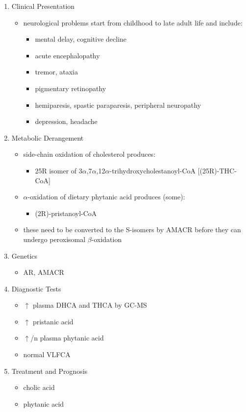 \documentclass{scrartcl}
\begin{document}
\begin{enumerate}
\item Clinical Presentation
\label{sec:org27cf602}
\begin{itemize}
\item neurological problems start from childhood to late adult life and
include:
\begin{itemize}
\item mental delay, cognitive decline
\item acute encephalopathy
\item tremor, ataxia
\item pigmentary retinopathy
\item hemiparesis, spastic paraparesis, peripheral neuropathy
\item depression, headache
\end{itemize}
\end{itemize}

\item Metabolic Derangement
\label{sec:org3d289dd}
\begin{itemize}
\item side-chain oxidation of cholesterol produces:
\begin{itemize}
\item 25R isomer of 3\(\alpha\),7\(\alpha\),12\(\alpha\)-trihydroxycholestanoyl-CoA [(25R)-THC-CoA]
\end{itemize}
\item \(\alpha\)-oxidation of dietary phytanic acid produces (some):
\begin{itemize}
\item (2R)-pristanoyl-CoA
\end{itemize}
\item these need to be converted to the S-isomers by AMACR before they can
undergo peroxisomal \(\beta\)-oxidation
\end{itemize}

\item Genetics
\label{sec:org3f9b9cf}
\begin{itemize}
\item AR, AMACR
\end{itemize}

\item Diagnostic Tests
\label{sec:org62cf2a5}
\begin{itemize}
\item \(\uparrow\) plasma DHCA and THCA by GC-MS
\item \(\uparrow\) pristanic acid
\item \(\uparrow\)/n plasma phytanic acid
\item normal VLFCA
\end{itemize}

\item Treatment and Prognosis
\label{sec:org82784d9}
\begin{itemize}
\item cholic acid
\item phytanic acid
\end{itemize}
\end{enumerate}
\end{document}

